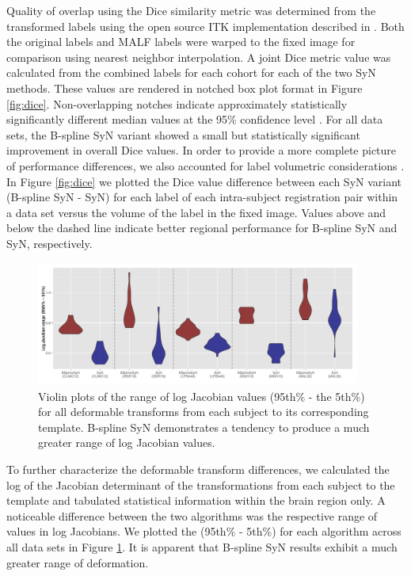 \documentclass{frontiersSCNS}
\begin{document}
Quality of overlap  using the 
Dice similarity metric 
was determined from the transformed labels
using the open source ITK
implementation described in \cite{tustison2009a}.
Both the original labels and MALF labels were warped
to the fixed image for comparison using nearest neighbor
interpolation.  A joint Dice metric value was calculated
from the combined labels for each cohort for each of the
two SyN methods.  These values are rendered in notched
box plot format in Figure \ref{fig:dice}.  Non-overlapping notches
indicate approximately statistically significantly different median values
at the 95\% confidence level \citep{mcgill1978}.
For all data sets, the B-spline SyN variant showed a small but statistically
significant improvement in overall Dice values.
In order to provide a more complete picture of performance differences,
we also accounted for label volumetric considerations \citep{rohlfing2012}.  In Figure
\ref{fig:dice} we plotted the Dice value difference between each
SyN variant (B-spline SyN - SyN) for each label of each intra-subject
registration pair within a data set versus the volume of the label
in the fixed image.  Values above and below the dashed line indicate better 
regional performance for B-spline SyN and SyN, respectively.

\begin{figure}[htb]
  \centering
    \includegraphics[width=0.95\textwidth]{jacobianRange.jpg}
  \caption{Violin plots of the range of log Jacobian values 
           (95th\% - the 5th\%)  
           for all deformable
           transforms from each subject to its corresponding
           template.  B-spline SyN demonstrates a tendency 
           to produce a much
           greater range of log Jacobian values.
           }
  \label{fig:jacobian}
\end{figure}

To further characterize the deformable transform differences, we 
calculated the log of the Jacobian determinant of the transformations from 
each subject to the template and 
tabulated statistical information within the brain region only. 
A noticeable difference between the two algorithms was the
respective range of values in log Jacobians.  We plotted the 
(95th\% - 5th\%) for each algorithm across all data sets
 in Figure \ref{fig:jacobian}.  It is apparent 
that B-spline SyN results exhibit a much greater range of deformation.
\end{document}
